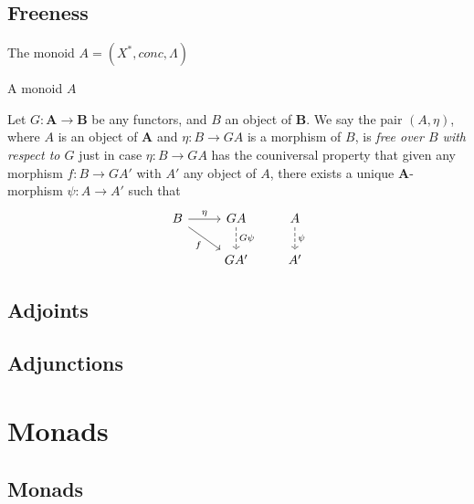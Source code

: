 \documentclass{article}
\begin{document}
\subsection{Freeness}
\begin{exam}[{\cite{AM75}}]
The monoid $A=(X^{*}, conc, \Lambda)$
\end{exam}

\begin{lem}[{\cite{AM75}}]
A monoid $A$
\end{lem}

\begin{defn}[{\cite{AM75}}]
Let $G: \mathbf{A} \rightarrow \mathbf{B}$ be any functors, and $B$ an object of $\mathbf{B}$.
We say the pair $(A, \eta)$, where $A$ is an object of $\mathbf{A}$ and $\eta: B \rightarrow GA$ is a morphism of $B$,
is \emph{free over $B$ with respect to $G$} just in case $\eta: B \rightarrow GA$ has the couniversal property that
given any morphism $f: B \rightarrow GA'$ with $A'$ any object of $A$,
there exists a unique $\mathbf{A}$-morphism $\psi: A \rightarrow A'$ such that
\[
\begin{tikzcd}
B \arrow[r, "\eta"] \arrow[rd, "f"'] & GA \arrow[d, dashrightarrow, "G\psi"] \\
                                     & GA'
\end{tikzcd}
\qquad
\begin{tikzcd}
A \arrow[d, dashrightarrow, "\psi"] \\
A'
\end{tikzcd}
\]
\end{defn}

\subsection{Adjoints}

\subsection{Adjunctions}

\section{Monads}

\subsection{Monads}

\end{document}

